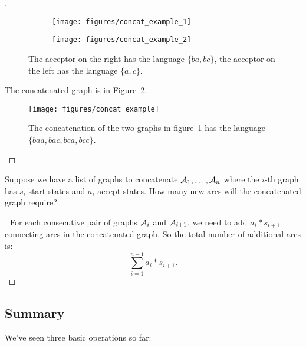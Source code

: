 \begin{proof}[\unskip\nopunct]

\begin{figure}
    \centering
    \begin{subfigure}[b]{0.48\textwidth}
        \centering
        \texttt{[image: figures/concat\_example\_1]}
    \end{subfigure}
    \begin{subfigure}[b]{0.48\textwidth}
        \centering
        \texttt{[image: figures/concat\_example\_2]}
    \end{subfigure}
    \caption{The acceptor on the right has the language $\{ba, bc\}$, the
    acceptor on the left has the language $\{a, c\}$.}
    \label{fig:concat_example_inputs}
\end{figure}

The concatenated graph is in Figure~\ref{fig:concat_example}.

\begin{figure}
    \centering
    \texttt{[image: figures/concat\_example]}
    \caption{The concatenation of the two graphs in
    figure~\ref{fig:concat_example_inputs} has the language $\{baa, bac, bca,
    bcc\}$.}
    \label{fig:concat_example}
\end{figure}

\end{proof}

\begin{example}
Suppose we have a list of graphs to concatenate $\mathcal{A}_1, \ldots, \mathcal{A}_n$ where the
$i$-th graph has $s_i$ start states and $a_i$ accept states. How many new
arcs will the concatenated graph require?
\end{example}

\begin{proof}[\unskip\nopunct]
For each consecutive pair of graphs $\mathcal{A}_i$ and $\mathcal{A}_{i+1}$, we need to add
$a_i * s_{i+1}$ connecting arcs in the concatenated graph. So the total
number of additional arcs is:
$$
\sum_{i=1}^{n-1} a_i * s_{i+1}.
$$
\end{proof}

\subsection{Summary}

We've seen three basic operations so far:


